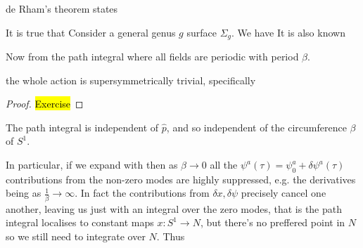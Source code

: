 \documentclass{article}
\begin{document}
\begin{theorem}
de Rham's theorem states 
\end{theorem}

\begin{example}
It is true that   
Consider a general genus $g$ surface $\Sigma_g$. We have 
It is also known 
\end{example}
Now from the path integral 
where all fields are periodic with period $\beta$. 
\begin{prop}
the whole action is supersymmetrically trivial, specifically  
\end{prop}
\begin{proof}
	\hl{Exercise}
\end{proof}
\begin{corollary}
The path integral is independent of $\hat{p}$, and so independent of  the circumference $\beta$ of $S^1$. 
\end{corollary}
In particular, if we expand 
with 
then as $\beta \to 0$ all the $\psi^a(\tau) = \psi_0^a + \delta \psi^a(\tau)$ contributions from the non-zero modes are highly suppressed, e.g. 
the derivatives being as $\frac{1}{\beta} \to \infty$. In fact the contributions from $\delta x, \delta \psi$ precisely cancel one another, leaving us just with an integral over the zero modes, that is the path integral localises to constant maps $x : S^1 \to N$, but there's no preffered point in $N$ so we still need to integrate over $N$. Thus 
\end{document}
